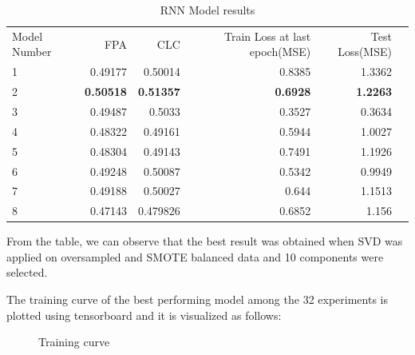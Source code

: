 \begin{table}[!htp]\centering
\caption{RNN Model results}\label{tab: }
\scriptsize
\begin{tabular}{lrrrrr}\toprule
Model Number &FPA &CLC &Train Loss at last epoch(MSE) &Test Loss(MSE) \\
1 &0.49177 &0.50014 &0.8385 &1.3362 \\\midrule
2 &\textbf{0.50518} &\textbf{0.51357} &\textbf{0.6928} &\textbf{1.2263} \\
3 &0.49487 &0.5033 &0.3527 &0.3634 \\
4 &0.48322 &0.49161 &0.5944 &1.0027 \\
5 &0.48304 &0.49143 &0.7491 &1.1926 \\
6 &0.49248 &0.50087 &0.5342 &0.9949 \\
7 &0.49188 &0.50027 &0.644 &1.1513 \\
8 &0.47143 &0.479826 &0.6852 &1.156 \\
\bottomrule
\end{tabular}
\end{table}

From the table, we can observe that the best result was obtained when SVD was applied on oversampled and SMOTE balanced data and 10 components were selected. 

The training curve of the best performing model among the 32 experiments is plotted using tensorboard and it is visualized as follows:

 \begin{figure}
%
  \caption{Training curve}
  \label{fig:key}
\end{figure}

